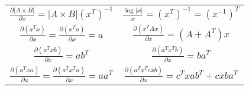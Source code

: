 \documentclass[10pt,landscape]{article}
\begin{document}
\begin{multicols}{3}
\begin{tabular}{cc}
$\frac{\partial |A \times B|}{\partial x} = |A \times B| (x^T)^{-1}$ & $\frac{\log |x|}{x} = (x^T)^{-1} = (x^{-1})^T$\\
$\frac{\partial (a^T x)}{\partial x} = \frac{\partial (x^T a)}{\partial x} = a$ & $\frac{\partial (x^T A x)}{\partial x} = (A + A^T) x$\\
$\frac{\partial (a^T x b)}{\partial x} = a b^T$ & $\frac{\partial (a^T x^T b)}{\partial x} = b a^T$\\
$\frac{\partial (a^T x a)}{\partial x} = \frac{\partial (a^T x^T a)}{\partial x} = a a^T$ & $\frac{\partial (a^T x^T c x b)}{\partial x} = c^T x a b^T + c x b a^T$\\
\end{tabular}

\end{multicols}
\end{document}
